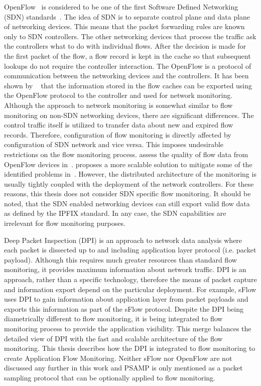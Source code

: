 OpenFlow~\cite{ONF-2012-OpenFlow} is considered to be one of the first Software Defined Networking (SDN) standards~\cite{Singh-2017-Survey, Hu-2014-Survey}. The idea of SDN is to separate control plane and data plane of networking devices. This means that the packet forwarding rules are known only to SDN controllers. The other networking devices that process the traffic ask the controllers what to do with individual flows. After the decision is made for the first packet of the flow, a flow record is kept in the cache so that subsequent lookups do not require the controller interaction. The OpenFlow is a protocol of communication between the networking devices and the controllers. It has been shown by \citeauthor{Yu-2013-FlowSense}~\cite{Yu-2013-FlowSense} that the information stored in the flow caches can be exported using the OpenFlow protocol to the controller and used for network monitoring. Although the approach to network monitoring is somewhat similar to flow monitoring on non-SDN networking devices, there are significant differences. The control traffic itself is utilized to transfer data about new and expired flow records. Therefore, configuration of flow monitoring is directly affected by configuration of SDN network and vice versa. This imposes undesirable restrictions on the flow monitoring process. \citeauthor{Hendriks-2016-Assessing} assess the quality of flow data from OpenFlow devices in~\cite{Hendriks-2016-Assessing}. \citeauthor{Suarez-Varela-2017-Towards} proposes a more scalable solution to mitigate some of the identified problems in~\cite{Suarez-Varela-2017-Towards}. However, the distributed architecture of the monitoring is usually tightly coupled with the deployment of the network controllers. For these reasons, this thesis does not consider SDN specific flow monitoring. It should be noted, that the SDN enabled networking devices can still export valid flow data as defined by the IPFIX standard. In any case, the SDN capabilities are irrelevant for flow monitoring purposes.

Deep Packet Inspection (DPI) is an approach to network data analysis where each packet is dissected up to and including application layer protocol (i.e. packet payload). Although this requires much greater resources than standard flow monitoring, it provides maximum information about network traffic. DPI is an approach, rather than a specific technology, therefore the means of packet capture and information export depend on the particular deployment. For example, sFlow uses DPI to gain information about application layer from packet payloads and exports this information as part of the sFlow protocol. Despite the DPI being diametrically different to flow monitoring, it is being integrated to flow monitoring process to provide the application visibility. This merge balances the detailed view of DPI with the fast and scalable architecture of the flow monitoring. This thesis describes how the DPI is integrated to flow monitoring to create Application Flow Monitoring. Neither sFlow nor OpenFlow are not discussed any further in this work and PSAMP is only mentioned as a packet sampling protocol that can be optionally applied to flow monitoring.


